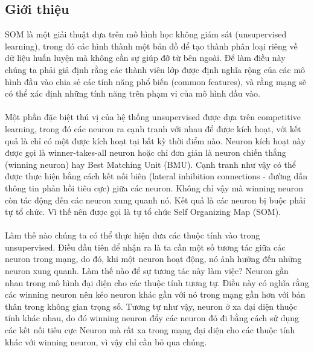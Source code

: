 \subsection{Giới thiệu}
SOM là một giải thuật dựa trên mô hình học không giám sát (unsupervised
learning), trong đó các hình thành một bản đồ để tạo thành phân loại riêng về dữ
liệu huấn luyện mà không cần sự giúp đỡ từ bên ngoài. Để làm điều này chúng ta
phải giả định rằng các thành viên lớp được định nghĩa rộng của các mô hình đầu
vào chia sẻ các tính năng phổ biến (common features), và rằng mạng sẽ có thể xác
định những tính năng trên phạm vi của mô hình đầu vào.\\\\ 
 Một phần đặc biệt thú vị của hệ thống unsupervised được dựa trên competitive
 learning, trong đó các neuron ra cạnh tranh với nhau để được kích hoạt, với kết
 quả là chỉ có một được kích hoạt tại bất kỳ thời điểm nào. Neuron kích hoạt này
 được gọi là winner-takes-all neuron hoặc chỉ đơn giản là neuron chiến thắng
 (winning neuron) hay Best Matching Unit (BMU). Cạnh tranh như vậy có thể được
 thực hiện bằng cách kết nối biên (lateral inhibition connections - đường dẫn
 thông tin phản hồi tiêu cực) giữa các neuron. Không chỉ vậy mà winning neuron
 còn tác động đến các neuron xung quanh nó. Kết quả là các neuron bị buộc phải
 tự tổ chức. Vì thế nên được gọi là tự tổ chức Self Organizing Map
 (SOM).\\\\ 
 Làm thế nào chúng ta có thể thực hiện đưa các thuộc tính vào trong
 unsupervised. Điều đầu tiên để nhận ra là ta cần một số tương tác giữa các
 neuron trong mạng, do đó, khi một neuron hoạt động, nó ảnh hưởng đến những
 neuron xung quanh. Làm thế nào để sự tương tác này làm việc? Neuron gần nhau
 trong mô hình đại diện cho các thuộc tính tương tự. Điều này có nghĩa rằng các
 winning neuron nên kéo neuron khác gần với nó trong mạng gần hơn với bản thân
 trong không gian trọng số. Tương tự như vậy, neuron ở xa đại diện thuộc tính
 khác nhau, do đó winning neuron đẩy các neuron đó đi bằng cách sử dụng các kết
 nối tiêu cực Neuron mà rất xa trong mạng đại diện cho các thuộc tính khác với
 winning neuron, vì vậy chỉ cần bỏ qua chúng.
